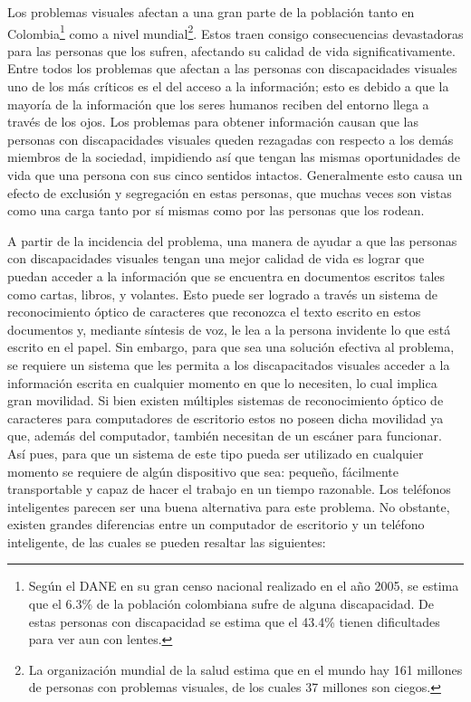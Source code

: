 \documentclass[a4paper, 11pt, oneside]{report}
\begin{document}
Los problemas visuales afectan a una gran parte de la población tanto en Colombia\footnote{Según el DANE en su gran censo nacional realizado en el año 2005, se estima que el 6.3\% de la población colombiana sufre de alguna discapacidad. De estas personas con discapacidad se estima que el 43.4\% tienen dificultades para ver aun con lentes.} como a nivel mundial\footnote{La organización mundial de la salud estima que en el mundo hay 161 millones de personas con problemas visuales, de los cuales 37 millones son ciegos.}. Estos traen consigo consecuencias devastadoras para las personas que los sufren, afectando su calidad de vida significativamente. Entre todos los problemas que afectan a las personas con discapacidades visuales uno de los más críticos es el del acceso a la información; esto es debido a que la mayoría de la información que los seres humanos reciben del entorno llega a través de los ojos. Los problemas para obtener información causan que las personas con discapacidades visuales queden rezagadas con respecto a los demás miembros de la sociedad, impidiendo así que tengan las mismas oportunidades de vida que una persona con sus cinco sentidos intactos. Generalmente esto causa un efecto de exclusión y segregación en estas personas, que muchas veces son vistas como una carga tanto por sí mismas como por las personas que los rodean. 

A partir de la incidencia del problema, una manera de ayudar a que las personas con discapacidades visuales tengan una mejor calidad de vida es lograr que puedan acceder a la información que se encuentra en documentos escritos tales como cartas, libros, y volantes. Esto puede ser logrado a través un sistema de reconocimiento óptico de caracteres que reconozca el texto escrito en estos documentos y, mediante síntesis de voz, le lea a la persona invidente lo que está escrito en el papel. Sin embargo, para que sea una solución efectiva al problema, se requiere un sistema que les permita a los discapacitados visuales acceder a la información escrita en cualquier momento en que lo necesiten, lo cual implica gran movilidad. Si bien existen múltiples sistemas de reconocimiento óptico de caracteres para computadores de escritorio estos no poseen dicha movilidad ya que, además del computador, también necesitan de un escáner para funcionar. Así pues, para que un sistema de este tipo pueda ser utilizado en cualquier momento se requiere de algún dispositivo que sea: pequeño, fácilmente transportable y capaz de hacer el trabajo en un tiempo razonable. Los teléfonos inteligentes parecen ser una buena alternativa para este problema. No obstante, existen grandes diferencias entre un computador de escritorio y un teléfono inteligente, de las cuales se pueden resaltar las siguientes:
\end{document}

